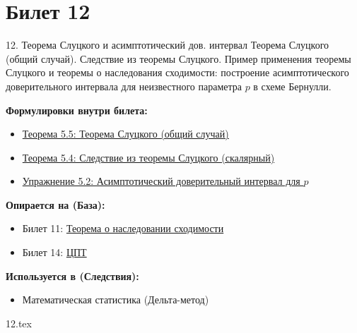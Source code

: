 \documentclass[a4paper, 12pt]{article}
\newcommand{\ticketsection}[1]{\vspace{0.5em}\noindent\textbf{\textcolor{ticketdark}{\sffamily #1}}\par}
\begin{document}
\section{Билет 12}
\begin{ticketskeleton}{12. Теорема Слуцкого и асимптотический дов. интервал}
     Теорема Слуцкого (общий случай). Следствие из теоремы Слуцкого. Пример применения теоремы Слуцкого и теоремы о наследования сходимости: построение асимптотического доверительного интервала для неизвестного параметра $p$ в схеме Бернулли.

    \ticketsection{Формулировки внутри билета:}
    \begin{itemize}
        \item \hyperref[thm:slutsky_gen]{Теорема 5.5: Теорема Слуцкого (общий случай)}
        \item \hyperref[thm:slutsky_cor]{Теорема 5.4: Следствие из теоремы Слуцкого (скалярный)}
        \item \hyperref[ex:ci_bernoulli]{Упражнение 5.2: Асимптотический доверительный интервал для $p$}
    \end{itemize}

    \ticketsection{Опирается на (База):}
    \begin{itemize}
        \item Билет 11: \hyperref[thm:cont_mapping]{Теорема о наследовании сходимости}
        \item Билет 14: \hyperref[thm:clt]{ЦПТ}
    \end{itemize}

    \ticketsection{Используется в (Следствия):}
    \begin{itemize}
        \item Математическая статистика (Дельта-метод)
    \end{itemize}
\end{ticketskeleton}

{12.tex}
\end{document}
